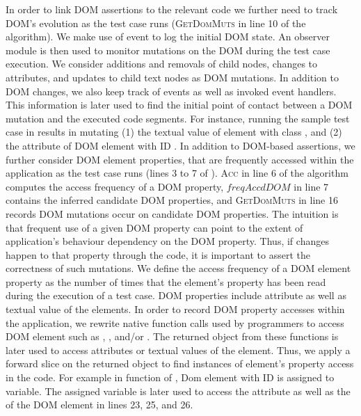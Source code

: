 In order to link DOM assertions to the relevant \javascript code we further need to track DOM's evolution as the test case runs (\textsc{GetDomMuts} in line 10 of the algorithm). We make use of  event to log the initial DOM state. An observer module is then used to monitor mutations on the DOM during the test case execution. 
We consider additions and removals of child nodes, changes to attributes, and updates to child text nodes as DOM mutations.
In addition to DOM changes, we also keep track of \javascript events as well as invoked event handlers. This information is later used to find the initial point of contact between a DOM mutation and the executed code segments.
For instance, running the sample test case in  results in mutating (1) the textual value of  element with class , and (2) the  attribute of DOM element with ID .
In addition to DOM-based assertions, we further consider DOM element properties, that are frequently accessed within the application as the test case runs (lines 3 to 7 of ). 
\textsc{Acc} in line 6 of the algorithm computes the access frequency of a DOM property, $freqAccdDOM$ in line 7 contains the inferred candidate DOM properties, and \textsc{GetDomMuts} in line 16 records DOM mutations occur
on candidate DOM properties.
The intuition is that frequent use of a given DOM property can point to the extent of application's behaviour dependency on the DOM property. Thus, if changes happen to that property through the \javascript code, it is important to assert the correctness of such mutations. We define the access frequency of a DOM element property as the number of times that the element's property has been read during the execution of a test case. DOM properties include attribute as well as textual value of the elements.
In order to record DOM property accesses within the application, we rewrite native function calls used by programmers to access DOM element such as , , and/or . The returned object from these functions is later used to access attributes or textual values of the element. Thus, we apply a forward slice on the returned object to find instances of element's property access in the code.
For example in function  of , Dom element with ID  is assigned to  variable. The assigned variable is later used to access the  attribute as well as the 
of the DOM element in lines 23, 25, and 26.

